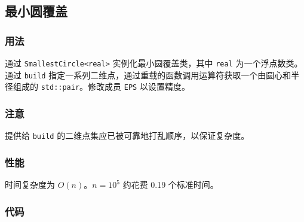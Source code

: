 \subsection{最小圆覆盖}

\subsubsection{用法}

通过 \lstinline{SmallestCircle<real>} 实例化最小圆覆盖类，其中 \lstinline{real} 为一个浮点数类。通过 \lstinline{build} 指定一系列二维点，通过重载的函数调用运算符获取一个由圆心和半径组成的 \lstinline{std::pair}。修改成员 \lstinline{EPS} 以设置精度。

\subsubsection{注意}

提供给 \lstinline{build} 的二维点集应已被可靠地打乱顺序，以保证复杂度。

\subsubsection{性能}

时间复杂度为 $O(n)$。$n = 10^5$ 约花费 0.19 个标准时间。

\subsubsection{代码}


